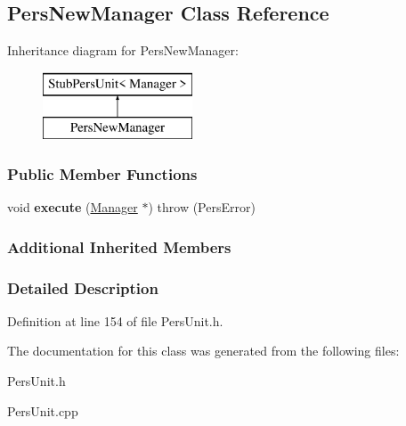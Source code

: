 \hypertarget{classPersNewManager}{\subsection{Pers\-New\-Manager Class Reference}
\label{d5/d99/classPersNewManager}
}
Inheritance diagram for Pers\-New\-Manager\-:\begin{figure}[H]
\begin{center}
\leavevmode
\includegraphics[height=2.000000cm]{d5/d99/classPersNewManager}
\end{center}
\end{figure}
\subsubsection*{Public Member Functions}
\begin{DoxyCompactItemize}
\item 
\hypertarget{classPersNewManager_a2465e298c83cd53a2e418a15fef87a75}{void {\bfseries execute} (\hyperlink{classManager}{Manager} $\ast$)  throw (\-Pers\-Error)}\label{d5/d99/classPersNewManager_a2465e298c83cd53a2e418a15fef87a75}

\end{DoxyCompactItemize}
\subsubsection*{Additional Inherited Members}


\subsubsection{Detailed Description}


Definition at line 154 of file Pers\-Unit.\-h.



The documentation for this class was generated from the following files\-:\begin{DoxyCompactItemize}
\item 
Pers\-Unit.\-h\item 
Pers\-Unit.\-cpp\end{DoxyCompactItemize}
